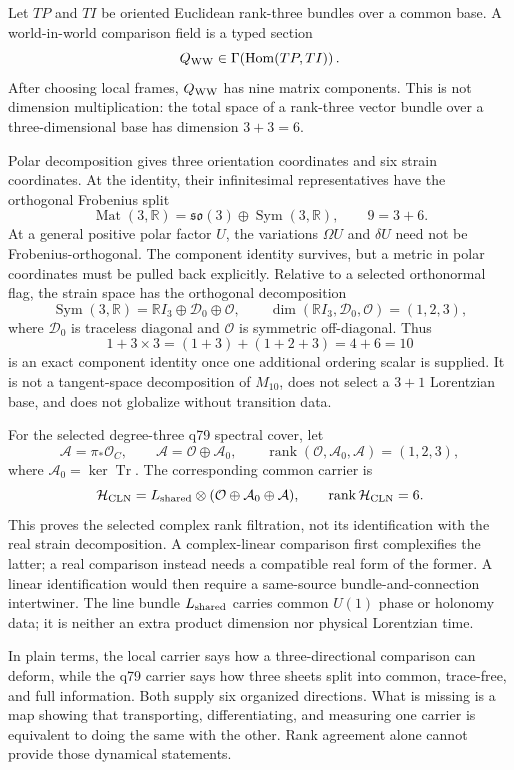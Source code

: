 \documentclass[11pt]{article}
\begin{document}
Let $TP$ and $TI$ be oriented Euclidean rank-three bundles over a common
base. A world-in-world comparison field is a typed section
\[
 Q_{\rm WW}\in\Gamma\!\left(\operatorname{Hom}(TP,TI)\right).
\]
After choosing local frames, $Q_{\rm WW}$ has nine matrix components. This is
not dimension multiplication: the total space of a rank-three vector bundle
over a three-dimensional base has dimension $3+3=6$.

Polar decomposition gives three orientation coordinates and six strain
coordinates. At the identity, their infinitesimal representatives have the
orthogonal Frobenius split
\[
 \operatorname{Mat}(3,\mathbb R)
 =\mathfrak{so}(3)\oplus\operatorname{Sym}(3,\mathbb R),
 \qquad 9=3+6.
\]
At a general positive polar factor $U$, the variations $\Omega U$ and
$\delta U$ need not be Frobenius-orthogonal. The component identity survives,
but a metric in polar coordinates must be pulled back explicitly.
Relative to a selected orthonormal flag, the strain space has the orthogonal
decomposition
\[
 \operatorname{Sym}(3,\mathbb R)
 =\mathbb RI_3\oplus\mathcal D_0\oplus\mathcal O,
 \qquad \dim(\mathbb RI_3,\mathcal D_0,\mathcal O)=(1,2,3),
\]
where $\mathcal D_0$ is traceless diagonal and $\mathcal O$ is symmetric
off-diagonal. Thus
\[
 1+3\times3=(1+3)+(1+2+3)=4+6=10
\]
is an exact component identity once one additional ordering scalar is supplied.
It is not a tangent-space decomposition of $M_{10}$, does not select a
$3+1$ Lorentzian base, and does not globalize without transition data.

For the selected degree-three q79 spectral cover, let
\[
 \mathcal A=\pi_*\mathcal O_C,
 \qquad \mathcal A=\mathcal O\oplus\mathcal A_0,
 \qquad \operatorname{rank}(\mathcal O,\mathcal A_0,\mathcal A)=(1,2,3),
\]
where $\mathcal A_0=\ker\operatorname{Tr}$. The corresponding common carrier
is
\[
 \mathcal H_{\rm CLN}
 =L_{\rm shared}\otimes(\mathcal O\oplus\mathcal A_0\oplus\mathcal A),
 \qquad \operatorname{rank}\mathcal H_{\rm CLN}=6.
\]
This proves the selected complex rank filtration, not its identification with
the real strain decomposition. A complex-linear comparison first
complexifies the latter; a real comparison instead needs a compatible real
form of the former. A linear identification would then require a same-source
bundle-and-connection intertwiner. The line bundle $L_{\rm shared}$ carries
common $U(1)$ phase or holonomy data; it is neither an extra product dimension
nor physical Lorentzian time.

In plain terms, the local carrier says how a three-directional comparison can
deform, while the q79 carrier says how three sheets split into common,
trace-free, and full information. Both supply six organized directions. What
is missing is a map showing that transporting, differentiating, and measuring
one carrier is equivalent to doing the same with the other. Rank agreement
alone cannot provide those dynamical statements.
\end{document}

